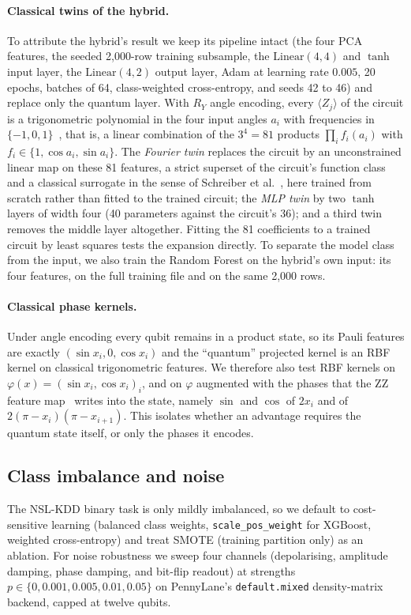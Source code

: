 \documentclass[preprint,11pt]{elsarticle}
\begin{document}
\paragraph{Classical twins of the hybrid.} To attribute the hybrid's result we keep its pipeline intact
(the four PCA features, the seeded 2{,}000-row training subsample, the $\mathrm{Linear}(4,4)$ and $\tanh$
input layer, the $\mathrm{Linear}(4,2)$ output layer, Adam at learning rate $0.005$, 20 epochs, batches
of 64, class-weighted cross-entropy, and seeds 42 to 46) and replace only the quantum layer. With $R_Y$
angle encoding, every $\langle Z_j\rangle$ of the circuit is a trigonometric polynomial in the four input
angles $a_i$ with frequencies in $\{-1,0,1\}$~\cite{schuld2021encoding}, that is, a linear combination of
the $3^4=81$ products $\prod_i f_i(a_i)$ with $f_i\in\{1,\cos a_i,\sin a_i\}$. The \emph{Fourier twin}
replaces the circuit by an unconstrained linear map on these 81 features, a strict superset of the
circuit's function class and a classical surrogate in the sense of Schreiber et
al.~\cite{schreiber2023surrogates}, here trained from scratch rather than fitted to the trained circuit; the \emph{MLP twin} by two $\tanh$ layers of width four (40 parameters against
the circuit's 36); and a third twin removes the middle layer altogether. Fitting the 81 coefficients to a
trained circuit by least squares tests the expansion directly. To separate the model class from the
input, we also train the Random Forest on the hybrid's own input: its four features, on the full
training file and on the same 2{,}000 rows.

\paragraph{Classical phase kernels.} Under angle encoding every qubit remains in a product state, so its
Pauli features are exactly $(\sin x_i, 0, \cos x_i)$ and the ``quantum'' projected kernel is an RBF kernel
on classical trigonometric features. We therefore also test RBF kernels on
$\varphi(x)=(\sin x_i,\cos x_i)_{i}$, and on $\varphi$ augmented with the phases that the ZZ feature
map~\cite{havlicek2019supervised} writes into the state, namely $\sin$ and $\cos$ of $2x_i$ and of
$2(\pi-x_i)(\pi-x_{i+1})$. This isolates whether an advantage requires the quantum state itself, or only
the phases it encodes.

\subsection{Class imbalance and noise}
The NSL-KDD binary task is only mildly imbalanced, so we default to cost-sensitive learning (balanced
class weights, \texttt{scale\_pos\_weight} for XGBoost, weighted cross-entropy) and treat SMOTE
(training partition only) as an ablation. For noise robustness we sweep four channels (depolarising,
amplitude damping, phase damping, and bit-flip readout) at strengths $p\in\{0,0.001,0.005,0.01,0.05\}$
on PennyLane's \texttt{default.mixed} density-matrix backend, capped at twelve qubits.
\end{document}
